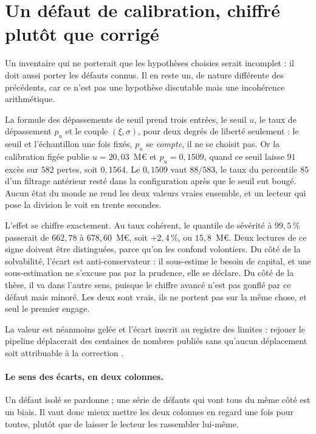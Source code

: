 \section{Un défaut de calibration, chiffré plutôt que corrigé}
\label{sec:pu-coherence}

Un inventaire qui ne porterait que les hypothèses choisies serait incomplet : il doit aussi
porter les défauts connus. Il en reste un, de nature différente des précédents, car ce n'est
pas une hypothèse discutable mais une incohérence arithmétique.

La formule des dépassements de seuil prend trois entrées, le seuil $u$, le taux de dépassement
$p_u$ et le couple $(\xi,\sigma)$, pour deux degrés de liberté seulement : le seuil et
l'échantillon une fois fixés, $p_u$ se \emph{compte}, il ne se choisit pas. Or la calibration
figée publie $u=20{,}03$~M\euro{} et $p_u=0{,}1509$, quand ce seuil laisse $91$ excès sur $582$
pertes, soit $0{,}1564$. Le $0{,}1509$ vaut $88/583$, le taux du percentile $85$ d'un filtrage
antérieur resté dans la configuration après que le seuil eut bougé. Aucun état du monde ne rend
les deux valeurs vraies ensemble, et un lecteur qui pose la division le voit en trente secondes.

L'effet se chiffre exactement. Au taux cohérent, le quantile de sévérité à $99{,}5\,\%$ passerait
de $662{,}78$ à $678{,}60$~M\euro, soit $+2{,}4\,\%$, ou $15{,}8$~M\euro. Deux lectures de ce signe
doivent être distinguées, parce qu'on les confond volontiers. Du côté de la solvabilité, l'écart
est anti-conservateur : il sous-estime le besoin de capital, et une sous-estimation ne s'excuse
pas par la prudence, elle se déclare. Du côté de la thèse, il va dans l'autre sens, puisque le
chiffre avancé n'est pas gonflé par ce défaut mais minoré. Les deux sont vrais, ils ne portent
pas sur la même chose, et seul le premier engage.

La valeur est néanmoins gelée et l'écart inscrit au registre des limites : rejouer le pipeline
déplacerait des centaines de nombres publiés sans qu'aucun déplacement soit attribuable à la
correction \matcomp.

\paragraph{Le sens des écarts, en deux colonnes.} Un défaut isolé se pardonne ; une série de
défauts qui vont tous du même côté est un biais. Il vaut donc mieux mettre les deux colonnes
en regard une fois pour toutes, plutôt que de laisser le lecteur les rassembler lui-même.

